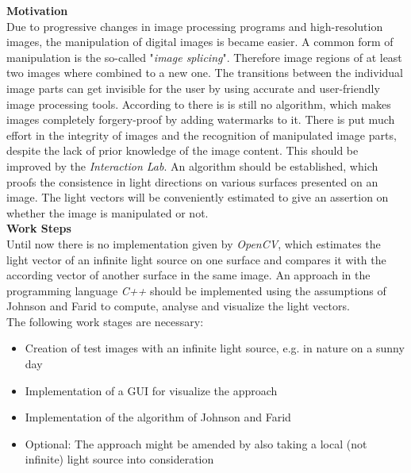 \textbf{Motivation} \\
Due to progressive changes in image processing programs and high-resolution images, the manipulation of digital images is became easier. A common form of manipulation is the so-called "\textit{image splicing}". Therefore image regions of at least two images where combined to a new one. The transitions between the individual image parts can get invisible for the user by using accurate and user-friendly image processing tools.
According to \cite{Hsu2006DetectingIS} there is is still no algorithm, which makes images completely forgery-proof by adding watermarks to it. There is put much effort in the integrity of images and the recognition of manipulated image parts, despite the lack of prior knowledge of the image content. This should be improved by the \textit{Interaction Lab}. An algorithm should be established, which proofs the consistence in light directions on various surfaces presented on an image. The light vectors will be conveniently estimated to give an assertion on whether the image is manipulated or not.\\

\textbf{Work Steps} \\
Until now there is no implementation given by \textit{OpenCV}, which estimates the light vector of an infinite light source on one surface and compares it with the according vector of another surface in the same image. An approach in the programming language \textit{C++} should be implemented using the assumptions of Johnson and Farid \cite{Johnson} to compute, analyse and visualize the light vectors. \\The following work stages are necessary: 

\begin{itemize}
\item Creation of test images with an infinite light source, e.g. in nature on a sunny day 
\item Implementation of a GUI for visualize the approach
\item Implementation of the algorithm of Johnson and Farid \cite{Johnson}
\item Optional: The approach might be amended by also taking a local (not infinite) light source into consideration \cite{Johnson}
\end{itemize}


